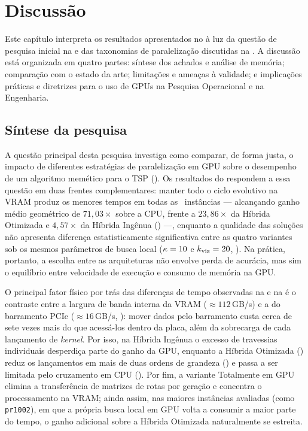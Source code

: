 \chapter{Discussão}\label{sec:discussao}

Este capítulo interpreta os resultados apresentados no  à luz da questão de pesquisa inicial na  e das taxonomias de paralelização discutidas na .
A discussão está organizada em quatro partes: síntese dos achados e análise de memória; comparação com o estado da arte; limitações e ameaças à validade; e implicações práticas e diretrizes para o uso de GPUs na Pesquisa Operacional e na Engenharia.

\section{Síntese da pesquisa}\label{sec-51-sintese-achados}

A questão principal desta pesquisa investiga como comparar, de forma justa, o impacto de diferentes estratégias de paralelização em GPU sobre o desempenho de um algoritmo memético para o TSP ().
Os resultados do  respondem a essa questão em duas frentes complementares: manter todo o ciclo evolutivo na VRAM produz os menores tempos em todas as \totalinstancias\ instâncias --- alcançando ganho médio geométrico de \(71{,}03\times\) sobre a CPU, frente a \(23{,}86\times\) da Híbrida Otimizada e \(4{,}57\times\) da Híbrida Ingênua () ---, enquanto a qualidade das soluções não apresenta diferença estatisticamente significativa entre as quatro variantes sob os mesmos parâmetros de busca local (\(\kappa = 10\) e \(k_{\text{viz}} = 20\), ).
Na prática, portanto, a escolha entre as arquiteturas não envolve perda de acurácia, mas sim o equilíbrio entre velocidade de execução e consumo de memória na GPU.

O principal fator físico por trás das diferenças de tempo observadas na  e na  é o contraste entre a largura de banda interna da VRAM (\(\approx 112\)\,GB/s) e a do barramento PCIe (\(\approx 16\)\,GB/s, ): mover dados pelo barramento custa cerca de sete vezes mais do que acessá-los dentro da placa, além da sobrecarga de cada lançamento de \emph{kernel}.
Por isso, na Híbrida Ingênua o excesso de travessias individuais desperdiça parte do ganho da GPU, enquanto a Híbrida Otimizada () reduz os lançamentos em mais de duas ordens de grandeza () e passa a ser limitada pelo cruzamento em CPU ().
Por fim, a variante Totalmente em GPU elimina a transferência de matrizes de rotas por geração e concentra o processamento na VRAM; ainda assim, nas maiores instâncias avaliadas (como \texttt{pr1002}), em que a própria busca local em GPU volta a consumir a maior parte do tempo, o ganho adicional sobre a Híbrida Otimizada naturalmente se estreita.

